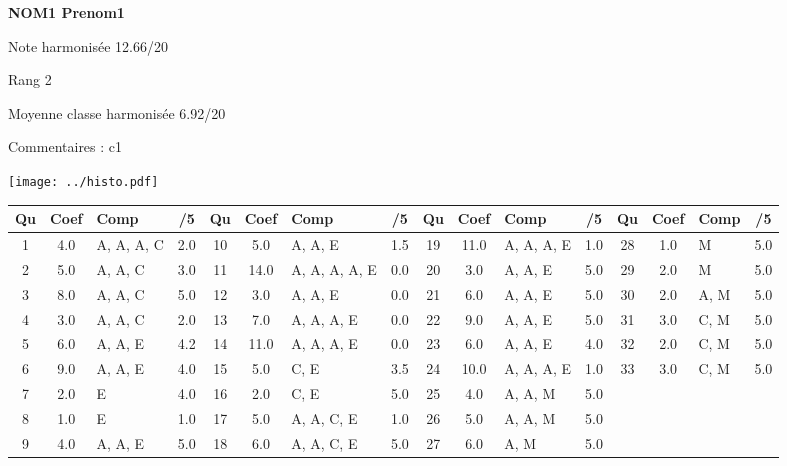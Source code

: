 \begin{minipage}[c]{.45\linewidth} 
\Large \textbf{\textsf{NOM1 Prenom1}} 
 
 \normalsize Note harmonisée 12.66/20 
 
Rang 2
 
Moyenne classe harmonisée 6.92/20 
 
Commentaires : 
c1 
\end{minipage}\hfill 
\begin{minipage}[c]{.45\linewidth}  
\begin{center}
\texttt{[image: ../histo.pdf]} 
\end{center}
\end{minipage}
\footnotesize 
\begin{center} 
\begin{tabular}{|c|c|m{1cm}|c||c|c|m{1cm}|c||c|c|m{1cm}|c||c|c|m{1cm}|c|} 
\hline \textbf{Qu} & \textbf{Coef} & \textbf{Comp} & \textbf{/5} & \textbf{Qu} & \textbf{Coef} & \textbf{Comp} & \textbf{/5} & \textbf{Qu} & \textbf{Coef} & \textbf{Comp} & \textbf{/5} & \textbf{Qu} & \textbf{Coef} & \textbf{Comp} & \textbf{/5} \\ 
\hline 
\hline 
1 & 4.0 & A, A, A, C & 2.0 & 10 & 5.0 & A, A, E & 1.5 & 19 & 11.0 & A, A, A, E & 1.0 & 28 & 1.0 & M & 5.0 \\ \hline 
2 & 5.0 & A, A, C & 3.0 & 11 & 14.0 & A, A, A, A, E & 0.0 & 20 & 3.0 & A, A, E & 5.0 & 29 & 2.0 & M & 5.0 \\ \hline 
3 & 8.0 & A, A, C & 5.0 & 12 & 3.0 & A, A, E & 0.0 & 21 & 6.0 & A, A, E & 5.0 & 30 & 2.0 & A, M & 5.0 \\ \hline 
4 & 3.0 & A, A, C & 2.0 & 13 & 7.0 & A, A, A, E & 0.0 & 22 & 9.0 & A, A, E & 5.0 & 31 & 3.0 & C, M & 5.0 \\ \hline 
5 & 6.0 & A, A, E & 4.2 & 14 & 11.0 & A, A, A, E & 0.0 & 23 & 6.0 & A, A, E & 4.0 & 32 & 2.0 & C, M & 5.0 \\ \hline 
6 & 9.0 & A, A, E & 4.0 & 15 & 5.0 & C, E & 3.5 & 24 & 10.0 & A, A, A, E & 1.0 & 33 & 3.0 & C, M & 5.0 \\ \hline 
7 & 2.0 & E & 4.0 & 16 & 2.0 & C, E & 5.0 & 25 & 4.0 & A, A, M & 5.0 &  &  &  &  \\ \hline 

8 & 1.0 & E & 1.0 & 17 & 5.0 & A, A, C, E & 1.0 & 26 & 5.0 & A, A, M & 5.0 &  &  &  &  \\ \hline 

9 & 4.0 & A, A, E & 5.0 & 18 & 6.0 & A, A, C, E & 5.0 & 27 & 6.0 & A, M & 5.0 &  &  &  &  \\ \hline 

\end{tabular} 
\end{center} 
\normalsize 
 
